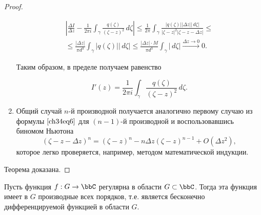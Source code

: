 \begin{proof}
\begin{enumerate}
\begin{multline*}
\left| \frac{\Delta I}{\Delta z} - \frac{1}{2\pi i} \int_\gamma \frac{q(\zeta)}{(\zeta - z)^2}\,d\zeta \right| 
\le \frac{1}{2\pi} \int_\gamma \frac{|q(\zeta)||\Delta z||\,d\zeta|}{|\zeta - z|^2|\zeta - z - \Delta z|} \le \\
\le \frac{|\Delta z|}{\pi d^3} \int_\gamma |q(\zeta)||\,d\zeta| 
\le \frac{|\Delta z| \cdot M}{\pi d^3} \int_\gamma |\,d\zeta| \xrightarrow{\Delta z \to 0} 0.
\end{multline*}

Таким образом, в пределе получаем равенство

\begin{equation} \label{ch34eq9}
I'(z) = \frac{1}{2\pi i} \int_\gamma \frac{q(\zeta)}{(\zeta - z)^2} \,d\zeta.
\end{equation}

\item 
Общий случай $n$-й производной получается аналогично первому случаю из формулы $\eqref{ch34eq6}$ для $(n - 1)$-й производной и воспользовавшись биномом Ньютона
$$
(\zeta - z - \Delta z)^n = (\zeta - z)^n - n \Delta z (\zeta - z)^{n - 1} + O(\Delta z^2),
$$
которое легко проверяется, например, методом математической индукции.
\end{enumerate}
\noindent
Теорема доказана.
\end{proof}

\begin{thm} \label{ch34Thm3}
Пусть функция $f : G \to \bbC$ регулярна в области $G \subset \bbC$. Тогда эта функция имеет в $G$ производные всех порядков, т.е. является бесконечно дифференцируемой функцией в области $G$.
\end{thm}

